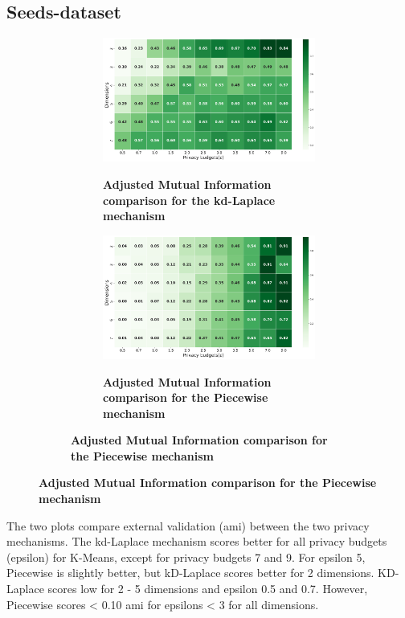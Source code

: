 \subsection{Seeds-dataset}
\begin{figure}[H]
  \centering
  \begin{subfigure}[b]{0.90\textwidth}
    \begin{subfigure}[c]{1\textwidth}
      \caption{\textbf{Adjusted Mutual Information comparison for the kd-Laplace mechanism}}
      \includegraphics[width=1\textwidth]{Results/kd-laplace/kd-Laplace/seeds-dataset/ami.png}
      \label{fig:ami_seeds-dataset_comparison_kdlaplace_2d}
    \end{subfigure}
    \vfill %
    \begin{subfigure}[c]{1\textwidth}
      \caption{\textbf{Adjusted Mutual Information comparison for the Piecewise mechanism}}
      \includegraphics[width=1\textwidth]{Results/kd-laplace/piecewise/seeds-dataset/ami.png}
      \label{fig:ami_seeds-dataset_comparison_piecewise_2d}
    \end{subfigure}
  \end{subfigure}
  
\end{figure}
The two plots compare external validation (\gls{ami}) between the two privacy mechanisms.
The kd-Laplace mechanism scores better for all privacy budgets (epsilon) for K-Means, except for privacy budgets 7 and 9.
For epsilon 5, Piecewise is slightly better, but kD-Laplace scores better for 2 dimensions.
KD-Laplace scores low for 2 - 5 dimensions and epsilon 0.5 and 0.7.
However, Piecewise scores < 0.10 \gls{ami} for epsilons < 3 for all dimensions.
\newpage
